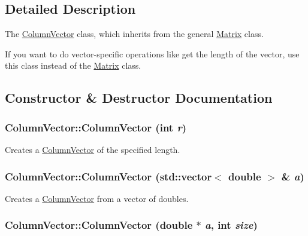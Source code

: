 \subsection{Detailed Description}
The \hyperlink{class_column_vector}{ColumnVector} class, which inherits from the general \hyperlink{class_matrix}{Matrix} class. 

If you want to do vector-specific operations like get the length of the vector, use this class instead of the \hyperlink{class_matrix}{Matrix} class. 

\subsection{Constructor \& Destructor Documentation}
\hypertarget{class_column_vector_080508988b684290b2a0123a923a1e08}{
\subsubsection[{ColumnVector}]{\setlength{\rightskip}{0pt plus 5cm}ColumnVector::ColumnVector (int {\em r})}}
\label{class_column_vector_080508988b684290b2a0123a923a1e08}


Creates a \hyperlink{class_column_vector}{ColumnVector} of the specified length. 

\hypertarget{class_column_vector_51a68a454f01918fd4bc1736ac0d4264}{
\subsubsection[{ColumnVector}]{\setlength{\rightskip}{0pt plus 5cm}ColumnVector::ColumnVector (std::vector$<$ double $>$ \& {\em a})}}
\label{class_column_vector_51a68a454f01918fd4bc1736ac0d4264}


Creates a \hyperlink{class_column_vector}{ColumnVector} from a vector of doubles. 

\hypertarget{class_column_vector_a0b9560305d34dd819e7913a811f3336}{
\subsubsection[{ColumnVector}]{\setlength{\rightskip}{0pt plus 5cm}ColumnVector::ColumnVector (double $\ast$ {\em a}, \/  int {\em size})}}
\label{class_column_vector_a0b9560305d34dd819e7913a811f3336}


